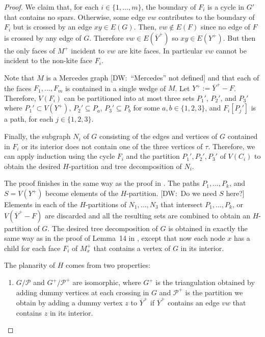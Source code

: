 \documentclass{patmorin}
\newcommand{\note}[2]{{\color{red}[#1:~#2]}}
\begin{document}
\begin{proof}
  We claim that, for each $i\in\{1,\ldots,m\}$, the boundary of $F_i$ is a cycle in $G'$ that contains no spars. Otherwise, some edge $vw$ contributes to the boundary of $F_i$ but is crossed by an edge $xy\in E(G)$. Then, $vw\not\in E(F)$ since no edge of $F$ is crossed by any edge of $G$. Therefore $vw\in E(\overline{Y}^+)$ so $xy\in E(Y^+)$. But then the only faces of $M^+$ incident to $vw$ are kite faces.  In particular $vw$ cannot be incident to the non-kite face $F_i$.
  
  Note that $M$ is a Mercedes graph 
  \note{DW}{``Mercedes'' not defined} and that each of the faces $F_1,\ldots,F_m$ is contained in a single wedge of $M$.   Let $Y^+ := \overline{Y}^+-F$. Therefore, $V(F_i)$ can be partitioned into at most three sets $P_1'$, $P_2'$, and $P_3'$ where $P_1'\subset V(Y^+)$, $P_2'\subseteq P_a$, $P_3'\subseteq P_b$ for some $a,b\in\{1,2,3\}$, and $F_i[P_j']$ is a path, for each $j\in\{1,2,3\}$. 

  Finally, the subgraph $N_i$ of $G$ consisting of the edges and vertices of $G$ contained in $F_i$ or its interior does not contain one of the three vertices of $\tau$. Therefore, we can apply induction using the cycle $F_i$ and the partition $P_1',P_2',P_3'$ of $V(C_i)$ to obtain the desired $H$-partition and tree decomposition of $N_i$.
  
  The proof finishes in the same way as the proof in \cite{dujmovic.joret.ea:planar}.  The paths $P_1,\ldots,P_k$, and $S=V(Y^+)$ become elements of the $H$-partition. 
  \note{DW}{Do we need $S$ here?}
   Elements in each of the $H$-partitions of $N_1,\ldots,N_3$ that intersect $P_1,\ldots,P_k$, or $V(\overline{Y}^+-F)$ are discarded and all the resulting sets are combined to obtain an $H$-partition of $G$.  The desired tree decomposition of $G$ is obtained in exactly the same way as in the proof of Lemma~14 in \cite{dujmovic.joret.ea:planar}, except that now each node $x$ has a child for each face $F_i$ of $M^+_x$ that contains a vertex of $G$ in its interior.
  
  The planarity of $H$ comes from two properties:
  \begin{enumerate}
    \item $G/\mathcal{P}$ and $G^+/\mathcal{P^+}$ are isomorphic, where $G^+$ is the triangulation obtained by adding dummy vertices at each crossing in $G$ and $\mathcal{P}^+$ is the partition we obtain by adding a dummy vertex $z$ to $\overline{Y}^+$ if $\overline{Y}^+$ contains an edge $vw$ that contains $z$ in its interior.  
    

\end{enumerate}
\end{proof}
\end{document}
